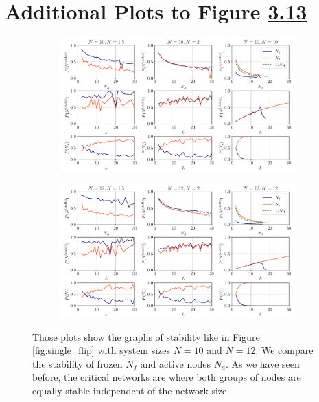 \section{Additional Plots to Figure \hyperref[fig:single_flip_stability]{3.13}}
\begin{figure}[h!]
	\begin{subfigure}{\textwidth}
		\includegraphics[width=\textwidth]{Plots/single_flip_stability_N10}
	\end{subfigure}
	\begin{subfigure}{\textwidth}
		\includegraphics[width=\textwidth]{Plots/single_flip_stability_N12}
	\end{subfigure}
	\caption{Those plots show the graphs of stability like in Figure \ref{fig:single_flip} with system sizes $N=10$ and $N=12$. We compare the stability of frozen $ N_f $ and active nodes $ N_a $. As we have seen before, the critical networks are where both groups of nodes are equally stable independent of the network size.}
	\label{fig:single_flip_additional}
\end{figure}

